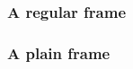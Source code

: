 \documentclass{beamer}
\begin{document}
\begin{frame}
  \frametitle{A regular frame}
\end{frame}
\begin{frame}[plain]
  \frametitle{A plain frame}
\end{frame}
\end{document}
